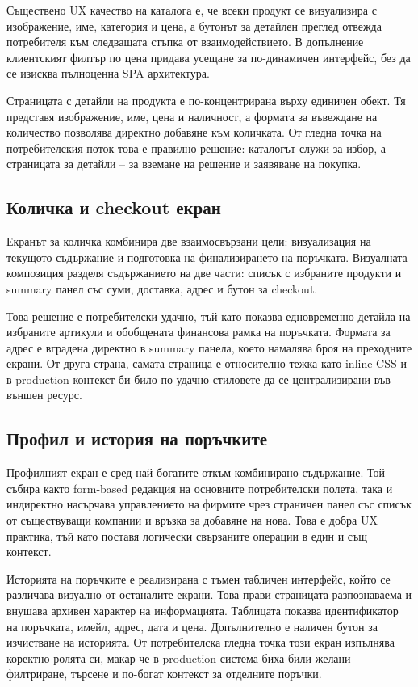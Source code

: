 Съществено UX качество на каталога е, че всеки продукт се визуализира с изображение, име, категория и цена, а бутонът за детайлен преглед отвежда потребителя към следващата стъпка от взаимодействието. В допълнение клиентският филтър по цена придава усещане за по-динамичен интерфейс, без да се изисква пълноценна SPA архитектура.

Страницата с детайли на продукта е по-концентрирана върху единичен обект. Тя представя изображение, име, цена и наличност, а формата за въвеждане на количество позволява директно добавяне към количката. От гледна точка на потребителския поток това е правилно решение: каталогът служи за избор, а страницата за детайли -- за вземане на решение и заявяване на покупка.

\subsection{Количка и checkout екран}

Екранът за количка комбинира две взаимосвързани цели: визуализация на текущото съдържание и подготовка на финализирането на поръчката. Визуалната композиция разделя съдържанието на две части: списък с избраните продукти и summary панел със суми, доставка, адрес и бутон за checkout.

Това решение е потребителски удачно, тъй като показва едновременно детайла на избраните артикули и обобщената финансова рамка на поръчката. Формата за адрес е вградена директно в summary панела, което намалява броя на преходните екрани. От друга страна, самата страница е относително тежка като inline CSS и в production контекст би било по-удачно стиловете да се централизирани във външен ресурс.

\subsection{Профил и история на поръчките}

Профилният екран е сред най-богатите откъм комбинирано съдържание. Той събира както form-based редакция на основните потребителски полета, така и индиректно насърчава управлението на фирмите чрез страничен панел със списък от съществуващи компании и връзка за добавяне на нова. Това е добра UX практика, тъй като поставя логически свързаните операции в един и същ контекст.

Историята на поръчките е реализирана с тъмен табличен интерфейс, който се различава визуално от останалите екрани. Това прави страницата разпознаваема и внушава архивен характер на информацията. Таблицата показва идентификатор на поръчката, имейл, адрес, дата и цена. Допълнително е наличен бутон за изчистване на историята. От потребителска гледна точка този екран изпълнява коректно ролята си, макар че в production система биха били желани филтриране, търсене и по-богат контекст за отделните поръчки.

